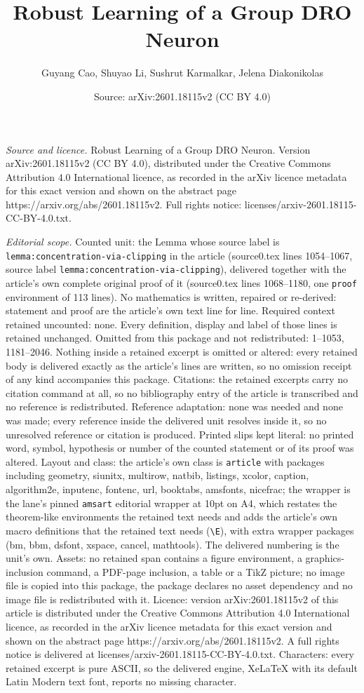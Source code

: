 \documentclass[10pt,a4paper]{amsart}
\title[Robust Learning of a Group DRO Neuron]{Robust Learning of a Group DRO Neuron}
\author{Guyang Cao, Shuyao Li, Sushrut Karmalkar, Jelena Diakonikolas}
\date{Source: arXiv:2601.18115v2 (CC BY 4.0)}
\begin{document}
\maketitle

\noindent\emph{Source and licence.} Robust Learning of a Group DRO Neuron. Version arXiv:2601.18115v2 (CC BY 4.0), distributed under the Creative Commons Attribution 4.0 International licence, as recorded in the arXiv licence metadata for this exact version and shown on the abstract page https://arxiv.org/abs/2601.18115v2. Full rights notice: licenses/arxiv-2601.18115-CC-BY-4.0.txt.\par\smallskip

\noindent\textit{Editorial scope.} Counted unit: the Lemma whose source label is \texttt{lemma:concentration-via-clipping} in the article (source0.tex lines 1054--1067, source label \texttt{lemma:concentration-via-clipping}), delivered together with the article's own complete original proof of it (source0.tex lines 1068--1180, one \texttt{proof} environment of 113 lines). No mathematics is written, repaired or re-derived: statement and proof are the article's own text line for line. Required context retained uncounted: none. Every definition, display and label of those lines is retained unchanged. Omitted from this package and not redistributed: 1--1053, 1181--2046. Nothing inside a retained excerpt is omitted or altered: every retained body is delivered exactly as the article's lines are written, so no omission receipt of any kind accompanies this package. Citations: the retained excerpts carry no citation command at all, so no bibliography entry of the article is transcribed and no reference is redistributed. Reference adaptation: none was needed and none was made; every reference inside the delivered unit resolves inside it, so no unresolved reference or citation is produced. Printed slips kept literal: no printed word, symbol, hypothesis or number of the counted statement or of its proof was altered. Layout and class: the article's own class is \texttt{article} with packages including geometry, siunitx, multirow, natbib, listings, xcolor, caption, algorithm2e, inputenc, fontenc, url, booktabs, amsfonts, nicefrac; the wrapper is the lane's pinned \texttt{amsart} editorial wrapper at 10pt on A4, which restates the theorem-like environments the retained text needs and adds the article's own macro definitions that the retained text needs (\texttt{\textbackslash E}), with extra wrapper packages (bm, bbm, dsfont, xspace, cancel, mathtools). The delivered numbering is the unit's own. Assets: no retained span contains a figure environment, a graphics-inclusion command, a PDF-page inclusion, a table or a TikZ picture; no image file is copied into this package, the package declares no asset dependency and no image file is redistributed with it. Licence: version arXiv:2601.18115v2 of this article is distributed under the Creative Commons Attribution 4.0 International licence, as recorded in the arXiv licence metadata for this exact version and shown on the abstract page https://arxiv.org/abs/2601.18115v2. A full rights notice is delivered at licenses/arxiv-2601.18115-CC-BY-4.0.txt. Characters: every retained excerpt is pure ASCII, so the delivered engine, XeLaTeX with its default Latin Modern text font, reports no missing character.
\end{document}
